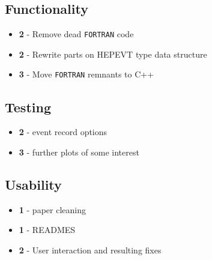 \documentclass[]{Photos_interface_design}
\begin{document}
\subsection*{Functionality}
\begin{itemize}
  \item[\ding{111}]{\bf 2} - Remove dead {\tt FORTRAN} code
  \item[\ding{111}]{\bf 2} - Rewrite parts on HEPEVT type data structure
  \item[\ding{111}]{\bf 3} - Move {\tt FORTRAN} remnants to C++
\end{itemize}

\subsection*{Testing}
\begin{itemize}
  \item[\ding{111}]{\bf 2} - event record options
  \item[\ding{111}]{\bf 3} - further plots of some interest
\end{itemize}

\subsection*{Usability}
\begin{itemize}
  \item[\ding{111}]{\bf 1} - paper cleaning
  \item[\ding{111}]{\bf 1} - READMES
  \item[\ding{111}]{\bf 2} - User interaction and resulting fixes
\end{itemize}
\end{document}
